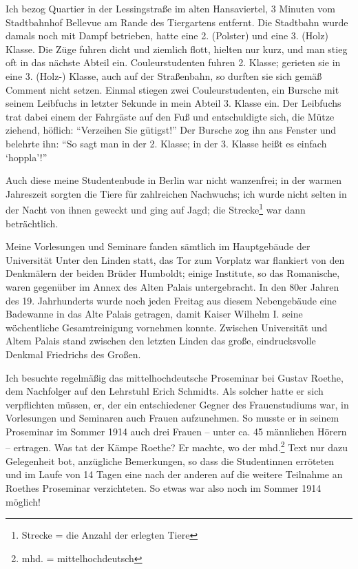 Ich bezog Quartier in der Lessingstraße im alten Hansaviertel, 3 Minuten vom Stadtbahnhof Bellevue am Rande des Tiergartens entfernt. Die Stadtbahn wurde damals noch mit Dampf betrieben, hatte eine 2. (Polster) und eine 3. (Holz) Klasse. Die Züge fuhren dicht und ziemlich flott, hielten nur kurz, und man stieg oft in das nächste Abteil ein. Couleurstudenten fuhren 2. Klasse; gerieten sie in eine 3. (Holz-) Klasse, auch auf der Straßenbahn, so durften sie sich gemäß Comment nicht setzen. Einmal stiegen zwei Couleurstudenten, ein Bursche mit seinem Leibfuchs in letzter Sekunde in mein Abteil 3. Klasse ein. Der Leibfuchs trat dabei einem der Fahrgäste auf den Fuß und entschuldigte sich, die Mütze ziehend, höflich: \enquote{Verzeihen Sie gütigst!} Der Bursche zog ihn ans Fenster und belehrte ihn: \enquote{So sagt man in der 2. Klasse; in der 3. Klasse heißt es einfach \enquote{hoppla}!}

Auch diese meine Studentenbude in Berlin war nicht wanzenfrei; in der warmen Jahreszeit sorgten die Tiere für zahlreichen Nachwuchs; ich wurde nicht selten in der Nacht von ihnen geweckt und ging auf Jagd; die Strecke\footnote{Strecke = die Anzahl der erlegten Tiere} war dann beträchtlich.

Meine Vorlesungen und Seminare fanden sämtlich im Hauptgebäude der Universität Unter den Linden statt, das Tor zum Vorplatz war flankiert von den Denkmälern der beiden Brüder Humboldt; einige Institute, so das Romanische, waren gegenüber im Annex des Alten Palais untergebracht. In den 80er Jahren des 19. Jahrhunderts wurde noch jeden Freitag aus diesem Nebengebäude eine Badewanne in das Alte Palais getragen, damit Kaiser Wilhelm I. seine wöchentliche Gesamtreinigung vornehmen konnte. Zwischen Universität und Altem Palais stand zwischen den letzten Linden das große, eindrucksvolle Denkmal Friedrichs des Großen.

Ich besuchte regelmäßig das mittelhochdeutsche Proseminar bei Gustav Roethe, dem Nachfolger auf den Lehrstuhl Erich Schmidts. Als solcher hatte er sich verpflichten müssen, er, der ein entschiedener Gegner des Frauenstudiums war, in Vorlesungen und Seminaren auch Frauen aufzunehmen. So musste er in seinem Proseminar im Sommer 1914 auch drei Frauen -- unter ca. 45 männlichen Hörern -- ertragen. Was tat der Kämpe Roethe? Er machte, wo der mhd.\footnote{mhd. = mittelhochdeutsch} Text nur dazu Gelegenheit bot, anzügliche Bemerkungen, so dass die Studentinnen erröteten und im Laufe von 14 Tagen eine nach der anderen auf die weitere Teilnahme an Roethes Proseminar verzichteten. So etwas war also noch im Sommer 1914 möglich!

